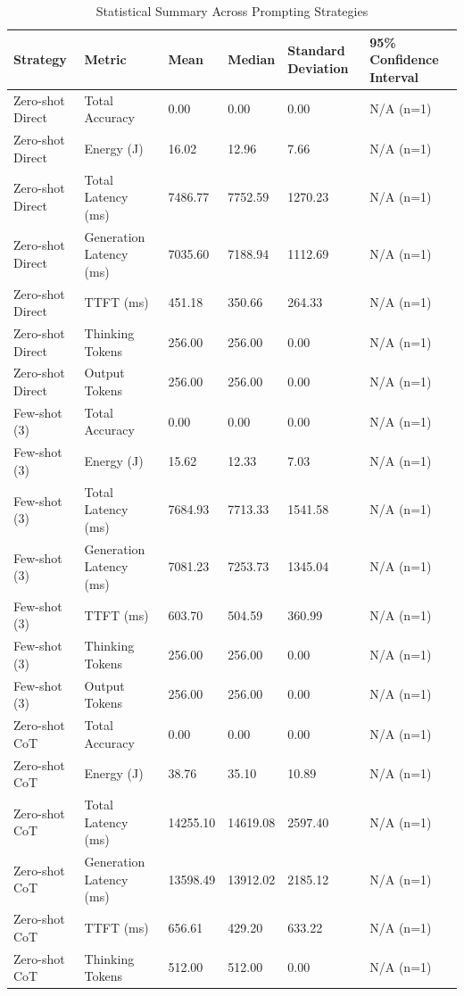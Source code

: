 \begin{table}
\caption{Statistical Summary Across Prompting Strategies}
\label{tab:statistical_summary}
\begin{tabular}{llllll}
\toprule
Strategy & Metric & Mean & Median & Standard Deviation & 95\% Confidence Interval \\
\midrule
Zero-shot Direct & Total Accuracy & 0.00 & 0.00 & 0.00 & N/A (n=1) \\
Zero-shot Direct & Energy (J) & 16.02 & 12.96 & 7.66 & N/A (n=1) \\
Zero-shot Direct & Total Latency (ms) & 7486.77 & 7752.59 & 1270.23 & N/A (n=1) \\
Zero-shot Direct & Generation Latency (ms) & 7035.60 & 7188.94 & 1112.69 & N/A (n=1) \\
Zero-shot Direct & TTFT (ms) & 451.18 & 350.66 & 264.33 & N/A (n=1) \\
Zero-shot Direct & Thinking Tokens & 256.00 & 256.00 & 0.00 & N/A (n=1) \\
Zero-shot Direct & Output Tokens & 256.00 & 256.00 & 0.00 & N/A (n=1) \\
Few-shot (3) & Total Accuracy & 0.00 & 0.00 & 0.00 & N/A (n=1) \\
Few-shot (3) & Energy (J) & 15.62 & 12.33 & 7.03 & N/A (n=1) \\
Few-shot (3) & Total Latency (ms) & 7684.93 & 7713.33 & 1541.58 & N/A (n=1) \\
Few-shot (3) & Generation Latency (ms) & 7081.23 & 7253.73 & 1345.04 & N/A (n=1) \\
Few-shot (3) & TTFT (ms) & 603.70 & 504.59 & 360.99 & N/A (n=1) \\
Few-shot (3) & Thinking Tokens & 256.00 & 256.00 & 0.00 & N/A (n=1) \\
Few-shot (3) & Output Tokens & 256.00 & 256.00 & 0.00 & N/A (n=1) \\
Zero-shot CoT & Total Accuracy & 0.00 & 0.00 & 0.00 & N/A (n=1) \\
Zero-shot CoT & Energy (J) & 38.76 & 35.10 & 10.89 & N/A (n=1) \\
Zero-shot CoT & Total Latency (ms) & 14255.10 & 14619.08 & 2597.40 & N/A (n=1) \\
Zero-shot CoT & Generation Latency (ms) & 13598.49 & 13912.02 & 2185.12 & N/A (n=1) \\
Zero-shot CoT & TTFT (ms) & 656.61 & 429.20 & 633.22 & N/A (n=1) \\
Zero-shot CoT & Thinking Tokens & 512.00 & 512.00 & 0.00 & N/A (n=1) \\

\end{tabular}
\end{table}
